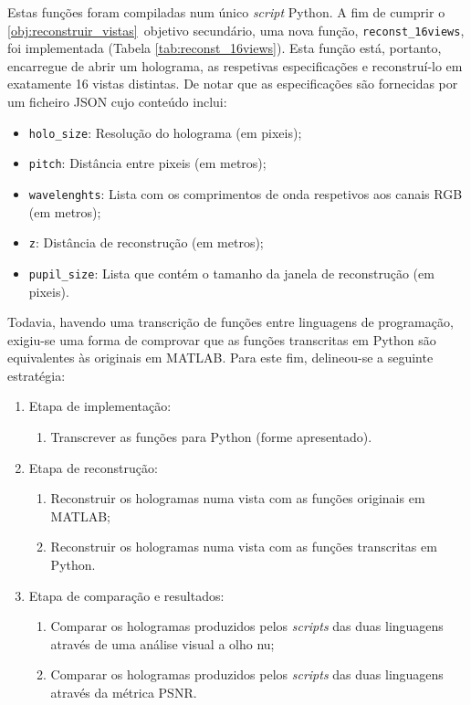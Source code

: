 Estas funções foram compiladas num único \textit{script} Python. A fim de cumprir o \ref{obj:reconstruir_vistas}\textordmasculine~objetivo secundário, uma nova função, \verb|reconst_16views|, foi implementada (Tabela \ref{tab:reconst_16views}). Esta função está, portanto, encarregue de abrir um holograma, as respetivas especificações e reconstruí-lo em exatamente 16 vistas distintas. De notar que as especificações são fornecidas por um ficheiro \ac{JSON} cujo conteúdo inclui:
\begin{itemize}
    \item \verb|holo_size|: Resolução do holograma (em pixeis);
    \item \verb|pitch|: Distância entre pixeis (em metros);
    \item \verb|wavelenghts|: Lista com os comprimentos de onda respetivos aos canais \ac{RGB} (em metros);
    \item \verb|z|: Distância de reconstrução (em metros);
    \item \verb|pupil_size|: Lista que contém o tamanho da janela de reconstrução (em pixeis).
\end{itemize}

Todavia, havendo uma transcrição de funções entre linguagens de programação, exigiu-se uma forma de comprovar que as funções transcritas em Python são equivalentes às originais em MATLAB. Para este fim, delineou-se a seguinte estratégia:

\begin{enumerate}
    \item Etapa de implementação:
    \begin{enumerate}
        \item Transcrever as funções para Python (forme apresentado).
    \end{enumerate}
    
    \item Etapa de reconstrução:
    \begin{enumerate}
        \item Reconstruir os hologramas numa vista com as funções originais em MATLAB;
        \item Reconstruir os hologramas numa vista com as funções transcritas em Python.
    \end{enumerate}

    \item Etapa de comparação e resultados:
    \begin{enumerate}
        \item Comparar os hologramas produzidos pelos \textit{scripts} das duas linguagens através de uma análise visual a olho nu;
        \item Comparar os hologramas produzidos pelos \textit{scripts} das duas linguagens através da métrica \ac{PSNR}.
    \end{enumerate}
\end{enumerate}


